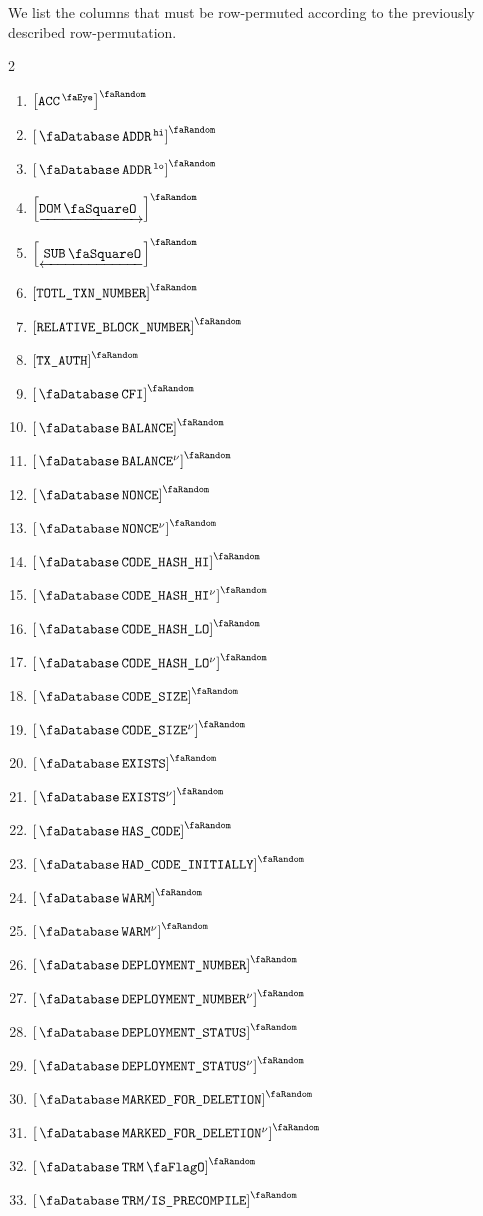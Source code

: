 We list the columns that must be row-permuted according to the previously described row-permutation.
\begin{multicols}{2}
	\begin{enumerate}
		\item $\order{\peekAccount}$
		\item $\order{\accAddress\high}$
		\item $\order{\accAddress\low}$
		\item $\order{\domStamp}$
		\item $\order{\subStamp}$
		\item $\order{\totalTransactionNumber}$
		\item $\order{\relBlockNum}$
		\item $\order{\txAuth}$
		\item $\order{\accCfi}$
		\item $\order{\accBalance}$
		\item $\order{\accBalance\new}$
		\item $\order{\accNonce}$
		\item $\order{\accNonce\new}$
		\item $\order{\accCodehashHi}$
		\item $\order{\accCodehashHi\new}$
		\item $\order{\accCodehashLo}$
		\item $\order{\accCodehashLo\new}$
		\item $\order{\accCodesize}$
		\item $\order{\accCodesize\new}$
		\item $\order{\accExists}$
		\item $\order{\accExists\new}$
		\item $\order{\accHasCode}$
		\item $\order{\accHadCodeInitially}$
		\item $\order{\accWarmth}$
		\item $\order{\accWarmth\new}$
		\item $\order{\accDeploymentNumber}$
		\item $\order{\accDeploymentNumber\new}$
		\item $\order{\accDeploymentStatus}$
		\item $\order{\accDeploymentStatus\new}$
		\item $\order{\accMarkedForDeletion}$
		\item $\order{\accMarkedForDeletion\new}$
		\item $\order{\accTrmFlag}$
		\item $\order{\accTrmIsPrecompile}$

\end{enumerate}
\end{multicols}
